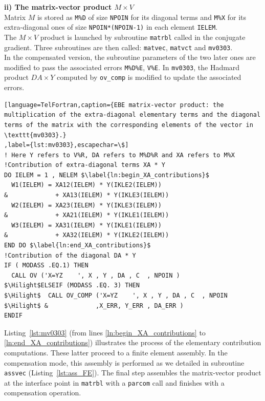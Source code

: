 %
\textbf{ii) The matrix-vector product $M \times V$}\\
Matrix $M$ is stored as \texttt{M\%D} of size \texttt{NPOIN}
for its diagonal terms and \texttt{M\%X} for its extra-diagonal ones
of size \texttt{NPOIN*(NPOIN-1)}
in each element \texttt{IELEM}.\\
%
The $M \times V$ product is launched by subroutine \texttt{matrbl}
called in the conjugate gradient.
Three subroutines are then called: \texttt{matvec}, \texttt{matvct}
and  \texttt{mv0303}.\\
In the compensated version, the subroutine parameters of
the two later ones are modified
to pass the associated errors \texttt{M\%D\%E}, \texttt{V\%E}.
In \texttt{mv0303}, the Hadmard product $DA \times Y$ computed
by \texttt{ov\_comp} is modified to update the associated errors.
%
\begin{lstlisting}[language=TelFortran,caption={EBE matrix-vector product: the multiplication of the extra-diagonal elementary terms and the diagonal terms of the matrix with the corresponding elements of the vector in \texttt{mv0303}.}
,label={lst:mv0303},escapechar=\$]
! Here Y refers to V%R, DA refers to M%D%R and XA refers to M%X
!Contribution of extra-diagonal terms XA * Y
DO IELEM = 1 , NELEM $\label{ln:begin_XA_contributions}$
  W1(IELEM) = XA12(IELEM) * Y(IKLE2(IELEM))
&             + XA13(IELEM) * Y(IKLE3(IELEM))
  W2(IELEM) = XA23(IELEM) * Y(IKLE3(IELEM))
&             + XA21(IELEM) * Y(IKLE1(IELEM))
  W3(IELEM) = XA31(IELEM) * Y(IKLE1(IELEM))
&             + XA32(IELEM) * Y(IKLE2(IELEM))
END DO $\label{ln:end_XA_contributions}$
!Contribution of the diagonal DA * Y
IF ( MODASS .EQ.1) THEN
  CALL OV ('X=YZ    ', X , Y , DA , C  , NPOIN )
$\Hilight$ELSEIF (MODASS .EQ. 3) THEN
$\Hilight$  CALL OV_COMP ('X=YZ    ', X , Y , DA , C  , NPOIN
$\Hilight$ &             ,X_ERR, Y_ERR , DA_ERR	)
ENDIF
\end{lstlisting}
%
Listing~\ref{lst:mv0303} (from lines \ref{ln:begin_XA_contributions} to
\ref{ln:end_XA_contributions}) illustrates the process of the
elementary contribution computations.
These latter proceed to a finite element assembly.
In the compensation mode, this assembly is performed as we detailed
in subroutine \texttt{assvec} (Listing~\ref{lst:ass_FE}).
%
The final step assembles the matrix-vector product
at the interface point in \texttt{matrbl} with a \texttt{parcom} call
and finishes with a compensation operation.
%

